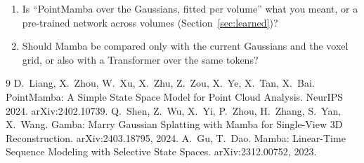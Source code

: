 \documentclass[10pt,a4paper]{article}
\begin{document}
\begin{qbox}
\begin{enumerate}
\item Is ``PointMamba over the Gaussians, fitted per volume'' what you meant, or a pre-trained network across
volumes (Section~\ref{sec:learned})?
\item Should Mamba be compared only with the current Gaussians and the voxel grid, or also with a Transformer over
the same tokens?
\end{enumerate}
\end{qbox}

\begin{thebibliography}{9}\small
{} D.~Liang, X.~Zhou, W.~Xu, X.~Zhu, Z.~Zou, X.~Ye, X.~Tan, X.~Bai. PointMamba: A Simple State Space
Model for Point Cloud Analysis. NeurIPS 2024. arXiv:2402.10739.
 Q.~Shen, Z.~Wu, X.~Yi, P.~Zhou, H.~Zhang, S.~Yan, X.~Wang. Gamba: Marry Gaussian Splatting with Mamba
for Single-View 3D Reconstruction. arXiv:2403.18795, 2024.
 A.~Gu, T.~Dao. Mamba: Linear-Time Sequence Modeling with Selective State Spaces. arXiv:2312.00752, 2023.
\end{thebibliography}
\end{document}
